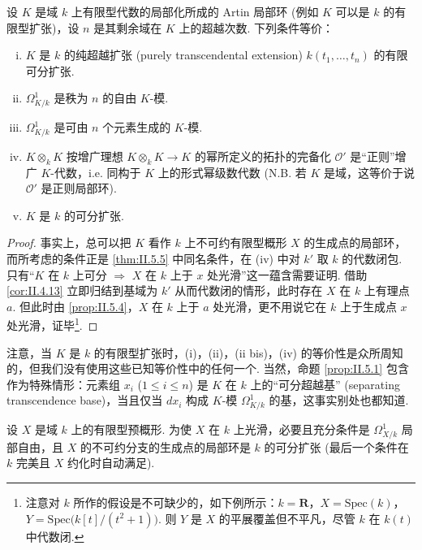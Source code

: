\begin{corollary}\label{cor:II.5.6}
设 $K$ 是域 $k$ 上有限型代数的局部化所成的 Artin 局部环 (例如 $K$ 可以是 $k$ 的有限型扩张)，设 $n$ 是其剩余域在 $K$ 上的超越次数. 下列条件等价：
\begin{enumerate}[(i)]
\item $K$ 是 $k$ 的纯超越扩张 (purely transcendental extension) $k(t_1, \dots, t_n)$ 的有限可分扩张.
\item $\varOmega_{K/k}^{1}$ 是秩为 $n$ 的自由 $K$-模.
\item[(ii bis)] $\varOmega_{K/k}^{1}$ 是可由 $n$ 个元素生成的 $K$-模.
\item $K \otimes_k K$ 按增广理想 $K \otimes_k K \to K$ 的幂所定义的拓扑的完备化 $\mathcal{O}'$ 是``正则''增广 $K$-代数，i.e. 同构于 $K$ 上的形式幂级数代数 (N.B. 若 $K$ 是域，这等价于说 $\mathcal{O}'$ 是正则局部环).
\item $K$ 是 $k$ 的可分扩张.
\end{enumerate}
\end{corollary}

\begin{proof}
事实上，总可以把 $K$ 看作 $k$ 上不可约有限型概形 $X$ 的生成点的局部环，而所考虑的条件正是 \ref{thm:II.5.5} 中同名条件，在 (iv) 中对 $k'$ 取 $k$ 的代数闭包. 只有``$K$ 在 $k$ 上可分 $\Rightarrow$ $X$ 在 $k$ 上于 $x$ 处光滑''这一蕴含需要证明. 借助 \ref{cor:II.4.13} 立即归结到基域为 $k'$ 从而代数闭的情形，此时存在 $X$ 在 $k$ 上有理点 $a$. 但此时由 \ref{prop:II.5.4}，$X$ 在 $k$ 上于 $a$ 处光滑，更不用说它在 $k$ 上于生成点 $x$ 处光滑，证毕\footnote{注意对 $k$ 所作的假设是不可缺少的，如下例所示：$k = \mathbf{R}$，$X = \mathrm{Spec}(k)$，$Y = \mathrm{Spec}\bigl(k[t]/(t^2+1)\bigr)$. 则 $Y$ 是 $X$ 的平展覆盖但不平凡，尽管 $k$ 在 $k(t)$ 中代数闭.}.
\end{proof}

注意，当 $K$ 是 $k$ 的有限型扩张时，(i)，(ii)，(ii bis)，(iv) 的等价性是众所周知的，但我们没有使用这些已知等价性中的任何一个. 当然，命题 \ref{prop:II.5.1} 包含作为特殊情形：元素组 $x_i$ ($1 \leqslant i \leqslant n$) 是 $K$ 在 $k$ 上的``可分超越基'' (separating transcendence base)，当且仅当 $dx_i$ 构成 $K$-模 $\varOmega_{K/k}^{1}$ 的基，这事实别处也都知道.

\begin{corollary}\label{cor:II.5.7}
设 $X$ 是域 $k$ 上的有限型预概形. 为使 $X$ 在 $k$ 上光滑，必要且充分条件是 $\varOmega_{X/k}^{1}$ 局部自由，且 $X$ 的不可约分支的生成点的局部环是 $k$ 的可分扩张 (最后一个条件在 $k$ 完美且 $X$ 约化时自动满足).
\end{corollary}


